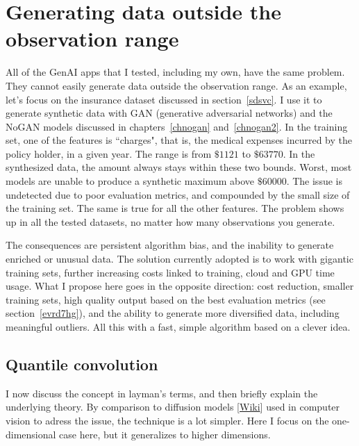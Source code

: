 \documentclass[oneside,10pt]{book}
\begin{document}
\section{Generating data outside the observation range}

All of the GenAI apps that I tested, including my own, have the same problem. They cannot easily generate data outside the observation range. 
As an example, let's focus on the insurance dataset discussed in section~\ref{sdsvc}. I use it to generate synthetic data
 with \textcolor{index}{GAN} (generative adversarial networks) and 
 the NoGAN models discussed in chapters~\ref{chnogan} and~\ref{chnogan2}. In the 
 training set, one of the features
 is ``charges", that is, the medical expenses incurred by the policy holder, in a given year.  The range is from $\$1121$ to  $\$\num{63770}$. In the synthesized data, the amount always stays within these two bounds. Worst, most models are 
 unable to produce a synthetic maximum above $\$\num{60000}$. The issue is undetected due to poor evaluation metrics,
 and compounded by the small size of the training set. The same is true for all the other features.  The problem shows up
 in all the tested datasets, no matter how many observations you generate.

The consequences are persistent algorithm bias, and the inability to generate enriched or unusual data. The solution currently adopted is to work
 with gigantic training sets, further increasing costs linked to training, cloud and GPU time usage. What I propose here goes in the opposite direction: cost reduction, smaller training sets, high quality output based on the best evaluation metrics (see section~\ref{evrd7hg}), and the ability
 to generate more diversified data, including meaningful outliers. All this with a fast, simple algorithm based on a clever idea. 

\subsection{Quantile convolution} 

I now discuss the concept in layman's terms, and then briefly explain the underlying theory. By comparison  to
 \textcolor{index}{diffusion models} [\href{https://en.wikipedia.org/wiki/Diffusion_model}{Wiki}] used in computer vision to adress the issue, the technique is a lot simpler. Here I  focus on the one-dimensional case here, but it generalizes to higher dimensions. 
\end{document}
